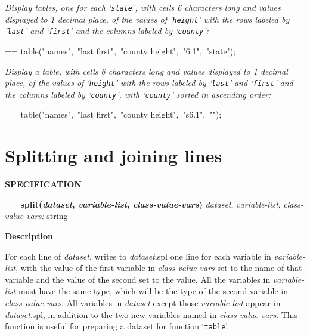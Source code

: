 \documentclass{book}
\makeatletter
\newcommand\Texinfocommandstyletextvar[1]{{\normalfont{}\textsl{#1}}}%
\newenvironment{Texinfopreformatted}{%
  \par\GNUTobeylines\obeyspaces\frenchspacing\parskip=\z@\parindent=\z@}{}
{\catcode`\^^M=13 \gdef\GNUTobeylines{\catcode`\^^M=13 \def^^M{\null\par}}}
\newenvironment{Texinfoindented}{\begin{list}{}{}\item\relax}{\end{list}}
\renewcommand{\_}{\Texinfounderscore\discretionary{}{}{}}
\makeatother
\begin{document}
\emph{Display tables, one for each `\texttt{state}',
with cells 6 characters long and values displayed
to 1 decimal place,
of the values of `\texttt{height}' with the rows
labeled by `\texttt{last}' and `\texttt{first}' and the columns labeled by
`\texttt{county}':}
\begin{Texinfoindented}
\begin{Texinfopreformatted}%
\ttfamily table("names",\ "last first",\ "county height",\ "6.1",\ "state");
\end{Texinfopreformatted}
\end{Texinfoindented}

\emph{Display a table, with cells 6 characters long and values displayed
to 1 decimal place,
of the values of `\texttt{height}' with the rows
labeled by `\texttt{last}' and `\texttt{first}' and the columns labeled by
`\texttt{county}', with `\texttt{county}' sorted in ascending order:}
\begin{Texinfoindented}
\begin{Texinfopreformatted}%
\ttfamily table("names",\ "last first",\ "county height",\ "s6.1",\ "");
\end{Texinfopreformatted}
\end{Texinfoindented}

\section{{Splitting and joining lines}}
\label{anchor:Splitting-and-joining-lines}%

\noindent{}\textbf{SPECIFICATION}
\begin{Texinfoindented}
\begin{Texinfopreformatted}%
\textbf{split(\Texinfocommandstyletextvar{dataset}, \Texinfocommandstyletextvar{variable-list}, \Texinfocommandstyletextvar{class-value-vars})}
\Texinfocommandstyletextvar{dataset}, \Texinfocommandstyletextvar{variable-list}, \Texinfocommandstyletextvar{class-value-vars:} string
\end{Texinfopreformatted}
\end{Texinfoindented}
%

\noindent{}\textbf{Description}

For each line of \Texinfocommandstyletextvar{dataset}, writes to \Texinfocommandstyletextvar{dataset}.spl one line
for each variable in \Texinfocommandstyletextvar{variable-list}, with the value of the first
variable in \Texinfocommandstyletextvar{class-value-vars}
set to the name of that variable and the value of the second set to the
value.
All the variables in \Texinfocommandstyletextvar{variable-list} must have the same type, which will be
the type of the second variable in \Texinfocommandstyletextvar{class-value-vars}.
All variables in \Texinfocommandstyletextvar{dataset} except those \Texinfocommandstyletextvar{variable-list} appear
in \Texinfocommandstyletextvar{dataset}.spl, in addition to the two new variables named in
\Texinfocommandstyletextvar{class-value-vars}.
This function is useful for preparing a dataset for function `\texttt{table}'.
\end{document}
